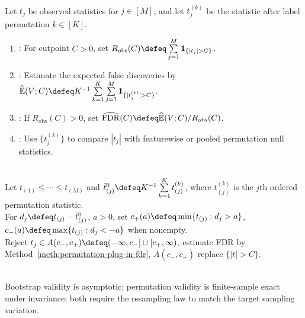 \begin{method} \label{meth:permutation-plug-in-fdr} \\
Let $t_j$ be observed statistics for $j\in[M]$, and let $t_j^{(k)}$ be the statistic after label permutation $k\in[K]$.
\begin{enumerate}[label=(\roman*)]
\setlength{\itemsep}{0pt}
\item {}: For cutpoint $C>0$, set $R_{\mathrm{obs}}(C)\defeq\sum\limits_{j=1}^M\mathbf{1}_{\{|t_j|>C\}}$.
\item {}: Estimate the expected false discoveries by $\widehat{\mathbb{E}}(V;C)\defeq K^{-1}\sum\limits_{k=1}^K\sum\limits_{j=1}^M\mathbf{1}_{\{|t_j^{(k)}|>C\}}$.
\item {}: If $R_{\mathrm{obs}}(C)>0$, set $\widehat{\operatorname{FDR}}(C)\defeq\widehat{\mathbb{E}}(V;C)/R_{\mathrm{obs}}(C)$.
\item {}: Use $\{t_j^{(k)}\}$ to compare $|t_j|$ with featurewise or pooled permutation null statistics.
\end{enumerate}
\end{method}

\begin{remark} \label{rem:sam-asymmetric-cutpoints} \\
Let $t_{(1)}\leq\cdots\leq t_{(M)}$ and $\bar{t}^{0}_{(j)}\defeq K^{-1}\sum\limits_{k=1}^Kt^{(k)}_{(j)}$, where $t^{(k)}_{(j)}$ is the $j$th ordered permutation statistic.\\
For $d_j\defeq t_{(j)}-\bar{t}^{0}_{(j)}$, $a>0$, set $c_+(a)\defeq\min\{t_{(j)}:d_j>a\}$, $c_-(a)\defeq\max\{t_{(j)}:d_j<-a\}$ when nonempty.\\
Reject $t_j\in A(c_-,c_+)\defeq(-\infty,c_-]\cup[c_+,\infty)$, estimate FDR by Method~\ref{meth:permutation-plug-in-fdr}, $A(c_-,c_+)$ replace $\{|t|>C\}$.
\end{remark}

\begin{remark} \label{rem:resampling-validity} \\
Bootstrap validity is asymptotic; permutation validity is finite-sample exact under invariance; both require the resampling law to match the target sampling variation.
\end{remark}
